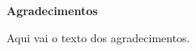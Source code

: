 
\begin{center}
\huge{{\bf Agradecimentos}}
\vspace{4cm}
\end{center}

Aqui vai o texto dos agradecimentos.
 
\clearpage
\thispagestyle{empty}
\cleardoublepage